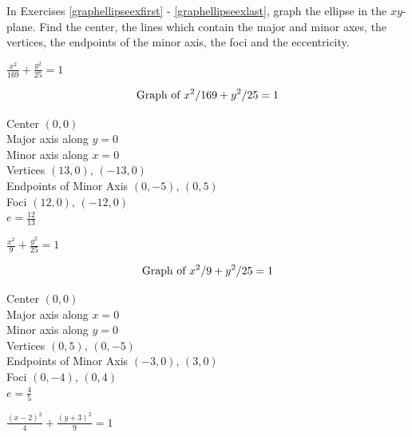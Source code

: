 \documentclass{ximera}
\begin{document}
	\author{Stitz-Zeager}



\label{ExercisesforEllipses}

\begin{question}
In Exercises \ref{graphellipseexfirst} - \ref{graphellipseexlast},  graph the ellipse in the $xy$-plane.  Find the center, the lines which contain the major and minor axes, the vertices, the endpoints of the minor axis, the foci and the eccentricity.

\begin{problem}\label{graphellipseexfirst}\label{oddellipseone}
$\frac{x^{2}}{169} + \frac{y^{2}}{25} = 1$ 

\begin{solution}
$$\text{Graph of $x^2/169 + y^2/25 = 1$}$$

Center $(0, 0)$\\
Major axis along $y = 0$\\
Minor axis along $x = 0$\\
Vertices $(13, 0), \, (-13, 0)$\\
Endpoints of Minor Axis $(0,-5)$, $(0,5)$ \\
Foci $(12, 0), \, (-12, 0)$\\
$e = \frac{12}{13}$\\
\end{solution}

\end{problem}

\begin{problem}
$\frac{x^2}{9} + \frac{y^2}{25} = 1$

\begin{solution}
$$\text{Graph of $x^2/9 + y^2/25 = 1$}$$

Center $(0, 0)$\\
Major axis along $x = 0$\\
Minor axis along $y = 0$\\
Vertices $(0,5), \, (0,-5)$\\
Endpoints of Minor Axis $(-3,0)$, $(3,0)$ \\
Foci $(0,-4), \, (0,4)$\\
$e = \frac{4}{5}$\\
\end{solution}

\end{problem}

\begin{problem}\label{oddellipsethree}
    $\frac{(x - 2)^{2}}{4} + \frac{(y + 3)^{2}}{9} = 1$


\end{problem}
\end{question}
\end{document}
